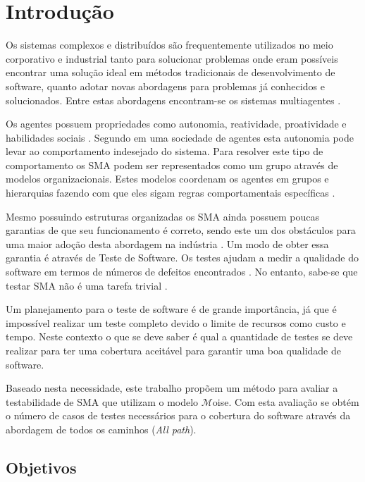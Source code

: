\tableofcontents

\chapter{Introdução}
  
Os sistemas complexos e distribuídos são frequentemente utilizados no meio corporativo e industrial tanto para solucionar problemas onde eram possíveis encontrar uma solução ideal em métodos tradicionais de desenvolvimento de software, quanto adotar novas abordagens para problemas já conhecidos e solucionados. Entre estas abordagens encontram-se os sistemas multiagentes \cite{benfield2006making}.

Os agentes possuem propriedades como autonomia, reatividade, proatividade e habilidades sociais \cite{jennings2000agent}. Segundo \citet{hubner2007developing} em uma sociedade de agentes esta autonomia pode levar ao comportamento indesejado do sistema. Para resolver este tipo de comportamento os SMA podem ser representados como um grupo através de modelos organizacionais. Estes modelos coordenam os agentes em grupos e hierarquias fazendo com que eles sigam regras comportamentais específicas \cite{van2005formal, argente2006multi}.

Mesmo possuindo estruturas organizadas os SMA ainda possuem poucas garantias de que seu funcionamento é correto, sendo este um dos obstáculos para uma maior adoção desta abordagem na indústria \cite{houhamdi2011multi,winikoff2010assurance}. Um modo de obter essa garantia é através de Teste de Software. Os testes ajudam a medir a qualidade do software em termos de números de defeitos encontrados \cite{graham2008foundations}. No entanto, sabe-se que testar SMA não é uma tarefa trivial \cite{winikoff2010assurance}.

Um planejamento para o teste de software é de grande importância, já que é impossível realizar um teste completo devido o limite de recursos como custo e tempo. Neste contexto o que se deve saber é qual a quantidade de testes se deve realizar para ter uma cobertura aceitável para garantir uma boa qualidade de software.

Baseado nesta necessidade, este trabalho propõem um método para avaliar a testabilidade de SMA que utilizam o modelo $\mathcal{M}$oise. Com esta avaliação se obtém o número de casos de testes necessários para o cobertura do software através da abordagem de todos os caminhos (\textit{All path}).


\section{Objetivos}

